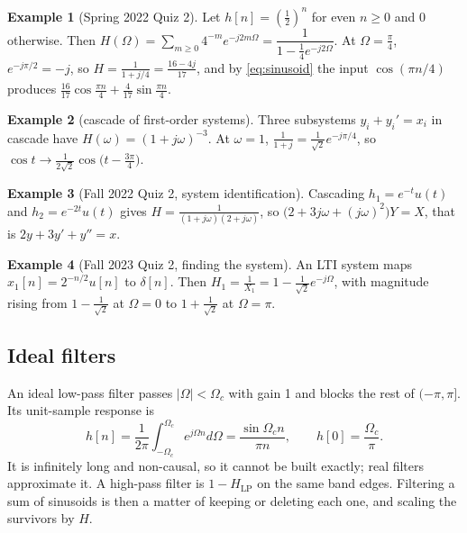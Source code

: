 \documentclass[11pt]{article}
\numberwithin{equation}{section}
\theoremstyle{definition}
\newtheorem{example}{Example}[section]
\theoremstyle{remark}
\begin{document}
\begin{example}[Spring 2022 Quiz 2]
Let $h[n]=\left(\frac12\right)^n$ for even $n\ge0$ and 0 otherwise. Then
$H(\Omega)=\sum_{m\ge0}4^{-m}e^{-j2m\Omega}=\dfrac{1}{1-\frac14e^{-j2\Omega}}$. At
$\Omega=\frac\pi4$, $e^{-j\pi/2}=-j$, so $H=\frac{1}{1+j/4}=\frac{16-4j}{17}$, and by
\eqref{eq:sinusoid} the input $\cos(\pi n/4)$ produces
$\frac{16}{17}\cos\frac{\pi n}{4}+\frac4{17}\sin\frac{\pi n}{4}$.
\end{example}

\begin{example}[cascade of first-order systems]
Three subsystems $y_i+y_i'=x_i$ in cascade have $H(\omega)=(1+j\omega)^{-3}$. At $\omega=1$,
$\frac{1}{1+j}=\frac{1}{\sqrt2}e^{-j\pi/4}$, so $\cos t\to\frac{1}{2\sqrt2}\cos\!\big(t-\frac{3\pi}{4}\big)$.
\end{example}

\begin{example}[Fall 2022 Quiz 2, system identification]
Cascading $h_1=e^{-t}u(t)$ and $h_2=e^{-2t}u(t)$ gives
$H=\frac{1}{(1+j\omega)(2+j\omega)}$, so $\big(2+3j\omega+(j\omega)^2\big)Y=X$, that is
$2y+3y'+y''=x$.
\end{example}

\begin{example}[Fall 2023 Quiz 2, finding the system]
An LTI system maps $x_1[n]=2^{-n/2}u[n]$ to $\delta[n]$. Then
$H_1=\frac{1}{X_1}=1-\frac{1}{\sqrt2}e^{-j\Omega}$, with magnitude rising from $1-\frac1{\sqrt2}$ at
$\Omega=0$ to $1+\frac1{\sqrt2}$ at $\Omega=\pi$.
\end{example}

\subsection{Ideal filters}
An ideal low-pass filter passes $|\Omega|<\Omega_c$ with gain 1 and blocks the rest of
$(-\pi,\pi]$. Its unit-sample response is
\begin{equation}
h[n]=\frac1{2\pi}\int_{-\Omega_c}^{\Omega_c}e^{j\Omega n}d\Omega=\frac{\sin\Omega_cn}{\pi n},
\qquad h[0]=\frac{\Omega_c}{\pi}.
\end{equation}
It is infinitely long and non-causal, so it cannot be built exactly; real filters approximate it.
A high-pass filter is $1-H_{\text{LP}}$ on the same band edges. Filtering a sum of sinusoids
is then a matter of keeping or deleting each one, and scaling the survivors by $H$.

\end{document}
